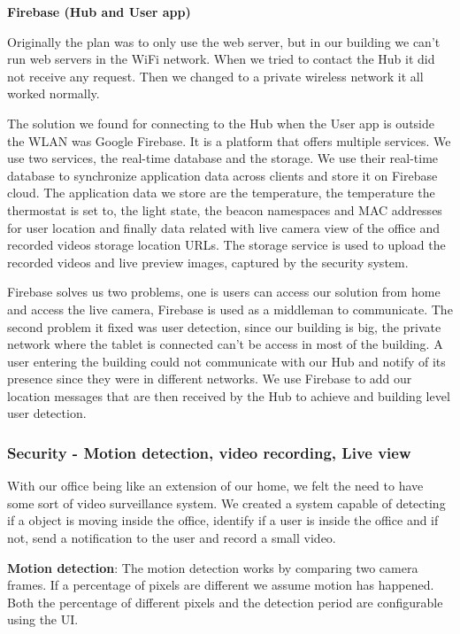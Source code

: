 \documentclass[conference]{IEEEtran}
\begin{document}
\textbf{Firebase (Hub and User app)}

Originally the plan was to only use the web server, but in our building we can't run web servers in the WiFi network. When we tried to contact the Hub it did not receive any request. Then we changed to a private wireless network it all worked normally.

The solution we found for connecting  to the Hub when the User app is outside the \ac{WLAN} was Google Firebase. It is a platform that offers multiple services. We use two services, the real-time database and the storage.
We use their real-time database to synchronize application data across clients and store it on Firebase cloud. The application data we store are the temperature, the temperature the thermostat is set to, the light state, the beacon namespaces and MAC addresses for user location and finally data related with live camera view of the office and recorded videos storage location URLs. The storage service is used to upload the recorded videos and live preview images, captured by the security system.

Firebase solves us two problems, one is users can access our solution from home and access the live camera, Firebase is used as a middleman to communicate. The second problem it fixed was user detection, since our building is big, the private network where the tablet is connected can't be access in most of the building. A user entering the building could not communicate with our Hub and notify of its presence since they were in different networks. We use Firebase to add our location messages that are then received by the Hub to achieve and building level user detection.

\subsubsection{Security - Motion detection, video recording, Live view}\label{imp:security_motion}

With our office being like an extension of our home, we felt the need to have some sort of video surveillance system. We created a system capable of detecting if a object is moving inside the office, identify if a user is inside the office and if not, send a notification to the user and record a small video.

\textbf{Motion detection}: The motion detection works by comparing two camera frames. If a percentage of pixels are different we assume motion has happened. Both the percentage of different pixels and the detection period are configurable using the \ac{UI}.
\end{document}
